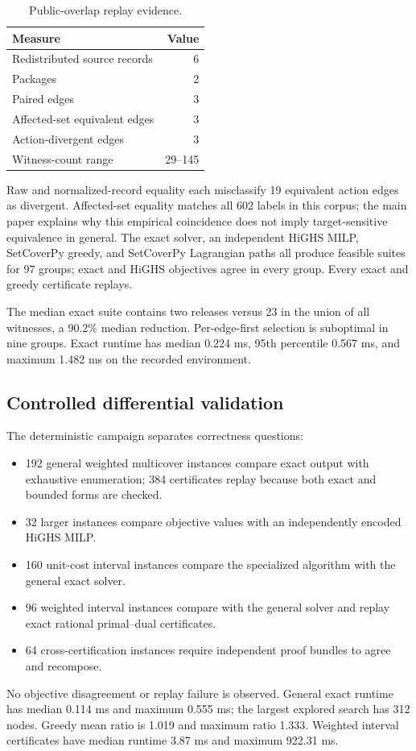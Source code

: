 \documentclass[10pt,conference]{IEEEtran}
\newcommand{\suppTableFont}{\footnotesize}
\begin{document}
\begin{table}[t]
\centering
\caption{Public-overlap replay evidence.}
\suppTableFont
\begin{tabular}{lr}
\toprule
Measure & Value \\
\midrule
Redistributed source records & 6 \\
Packages & 2 \\
Paired edges & 3 \\
Affected-set equivalent edges & 3 \\
Action-divergent edges & 3 \\
Witness-count range & 29--145 \\
\bottomrule
\end{tabular}
\end{table}

Raw and normalized-record equality each misclassify 19 equivalent action edges as divergent. Affected-set equality matches all 602 labels in this corpus; the main paper explains why this empirical coincidence does not imply target-sensitive equivalence in general. The exact solver, an independent HiGHS MILP, SetCoverPy greedy, and SetCoverPy Lagrangian paths all produce feasible suites for 97 groups; exact and HiGHS objectives agree in every group. Every exact and greedy certificate replays.

The median exact suite contains two releases versus 23 in the union of all witnesses, a 90.2\% median reduction. Per-edge-first selection is suboptimal in nine groups. Exact runtime has median 0.224 ms, 95th percentile 0.567 ms, and maximum 1.482 ms on the recorded environment.

\subsection{Controlled differential validation}
The deterministic campaign separates correctness questions:
\begin{itemize}
  \item 192 general weighted multicover instances compare exact output with exhaustive enumeration; 384 certificates replay because both exact and bounded forms are checked.
  \item 32 larger instances compare objective values with an independently encoded HiGHS MILP.
  \item 160 unit-cost interval instances compare the specialized algorithm with the general exact solver.
  \item 96 weighted interval instances compare with the general solver and replay exact rational primal--dual certificates.
  \item 64 cross-certification instances require independent proof bundles to agree and recompose.
\end{itemize}
No objective disagreement or replay failure is observed. General exact runtime has median 0.114 ms and maximum 0.555 ms; the largest explored search has 312 nodes. Greedy mean ratio is 1.019 and maximum ratio 1.333. Weighted interval certificates have median runtime 3.87 ms and maximum 922.31 ms.
\end{document}
